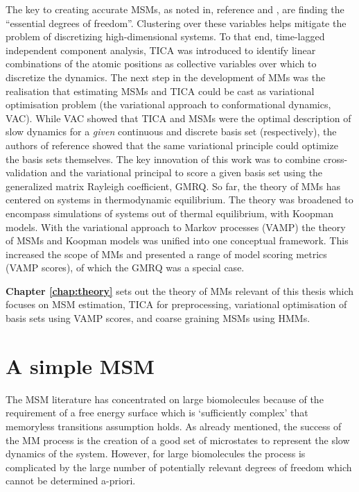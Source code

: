 The key to creating accurate MSMs, as noted in, reference  \cite{zwanzigClassicalDynamicsContinuous1983a} and \cite{schutteDirectApproachConformational1999}, are finding the ``essential degrees of freedom''. Clustering over these variables helps mitigate the problem of discretizing high-dimensional systems. To that end, time-lagged independent component analysis, TICA\cite{perez-hernandezIdentificationSlowMolecular2013a, schwantesImprovementsMarkovState2013} was introduced to identify linear combinations of the atomic positions as collective variables over which to discretize the dynamics. 
The next step in the development of MMs was the realisation that estimating MSMs and TICA could be cast as variational optimisation problem (the variational approach to conformational dynamics, VAC\cite{nuskeVariationalApproachMolecular2014}). While VAC showed that TICA and MSMs were the optimal description of slow dynamics for a \emph{given} continuous and discrete basis set (respectively), the authors of reference \cite{mcgibbonVariationalCrossvalidationSlow2015} showed that the same variational principle could optimize the basis sets themselves. The key innovation of this work was to combine cross-validation\cite{arlotSurveyCrossvalidationProcedures2009} and the variational principal to score a given basis set using the generalized matrix Rayleigh coefficient, GMRQ. So far, the theory of MMs has centered on systems in thermodynamic equilibrium. The theory was broadened to encompass simulations of systems out of thermal equilibrium, with Koopman models\cite{wuVariationalKoopmanModels2017}. With the variational approach to Markov processes (VAMP) the theory of MSMs and Koopman models was unified into one conceptual framework. This increased the scope of MMs and presented a range of model scoring metrics (VAMP scores), of which the GMRQ was a special case.

\textbf{Chapter \ref{chap:theory}} sets out the theory of MMs relevant of this thesis which focuses on MSM estimation, TICA for preprocessing, variational optimisation of basis sets using VAMP scores, and coarse graining MSMs using HMMs. 

\section{A simple MSM}
The MSM literature has concentrated on large biomolecules because of the requirement of a free energy surface which is `sufficiently complex' that memoryless transitions assumption holds. As already mentioned, the success of the MM process is the creation of a good set of microstates to represent the slow dynamics of the system. However, for large biomolecules the process is complicated by the large number of potentially relevant degrees of freedom which cannot be determined a-priori\cite{shallowayMacrostatesClassicalStochastic1996}. 


